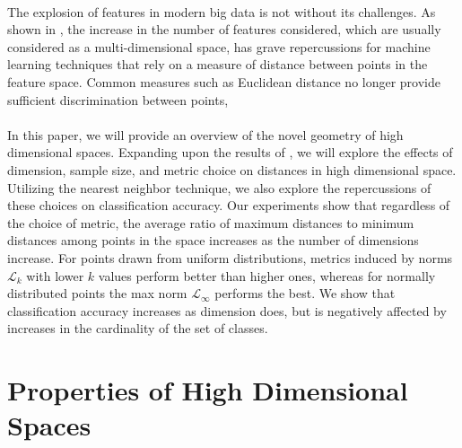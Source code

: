 \documentclass{article}
\begin{document}
\paragraph{}
The explosion of features in modern big data is not without its challenges.  As shown in \cite{aggarwal2001surprising}, the increase in the number of features considered, which are usually considered as a multi-dimensional space, has grave repercussions for machine learning techniques that rely on a measure of distance between points in the feature space. Common measures such as Euclidean distance no longer provide sufficient discrimination between points,
\paragraph{}
In this paper, we will provide an overview of the novel geometry of high dimensional spaces. Expanding upon the results of \cite{aggarwal2001surprising}, we will explore the effects of dimension, sample size, and metric choice on distances in high dimensional space. Utilizing the nearest neighbor technique, we also explore the repercussions of these choices on classification accuracy. Our experiments show that regardless of the choice of metric, the average ratio of maximum distances to minimum distances among points in the space increases as the number of dimensions increase. For points drawn from uniform distributions, metrics induced by norms $\mathcal{L}_k$ with lower $k$ values perform better than higher ones, whereas for normally distributed points the max norm  $\mathcal{L}_{\infty}$ performs the best. We show that classification accuracy increases as dimension does, but is negatively affected by increases in the cardinality of the set of classes.

\section{Properties of High Dimensional Spaces}
\end{document}
